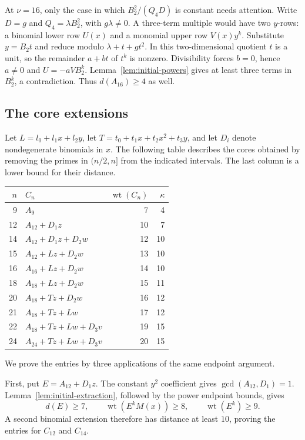 \documentclass[11pt]{article}
\DeclareMathOperator{\wt}{wt}\DeclareMathOperator{\ord}{ord}
\numberwithin{equation}{section}
\theoremstyle{definition}\newtheorem{definition}[theorem]{Definition}
\theoremstyle{remark}\newtheorem{remark}[theorem]{Remark}
\begin{document}
At $\nu=16$, only the case in which $B_2^2/(Q_4D)$ is constant
needs attention.
Write $D=g$ and $Q_4=\lambda B_2^2$, with $g\lambda\ne0$.
A three-term multiple would have two $y$-rows: a binomial lower row
$U(x)$ and a monomial upper row $V(x)y^k$. Substitute $y=B_2t$ and
reduce modulo $\lambda+t+gt^2$. In this two-dimensional quotient
$t$ is a unit, so the remainder $a+bt$ of $t^k$ is nonzero.
Divisibility forces $b=0$, hence $a\ne0$ and $U=-aVB_2^k$.
Lemma~\ref{lem:initial-powers} gives at least three terms in $B_2^k$,
a contradiction. Thus $d(A_{16})\ge4$ as well.

\subsection{The core extensions}

Let $L=l_0+l_1x+l_2y$, let
$T=t_0+t_1x+t_2x^2+t_3y$, and let $D_i$ denote nondegenerate
binomials in $x$. The following table describes the cores obtained by
removing the primes in $(n/2,n]$ from the indicated intervals.
The last column is a lower bound for their distance.
\begin{center}
\begin{tabular}{r|l|rr}
\toprule
$n$&$C_n$&$\wt(C_n)$&$\kappa$\\\midrule
9&$A_9$&7&4\\
12&$A_{12}+D_1z$&10&7\\
14&$A_{12}+D_1z+D_2w$&12&10\\
15&$A_{12}+Lz+D_2w$&13&10\\
16&$A_{16}+Lz+D_2w$&14&10\\
18&$A_{18}+Lz+D_2w$&15&11\\
20&$A_{18}+Tz+D_2w$&16&12\\
21&$A_{18}+Tz+Lw$&17&12\\
22&$A_{18}+Tz+Lw+D_3v$&19&15\\
24&$A_{24}+Tz+Lw+D_3v$&20&15\\
\bottomrule
\end{tabular}
\end{center}
We prove the entries by three applications of the same endpoint argument.

First, put $E=A_{12}+D_1z$. The constant $y^2$ coefficient gives
$\gcd(A_{12},D_1)=1$. Lemma~\ref{lem:initial-extraction}, followed by
the power endpoint bounds, gives
\begin{equation}\label{eq:initial-twelve-E}
 d(E)\ge7,\qquad \wt(E^kM(x))\ge8,\qquad \wt(E^k)\ge9.
\end{equation}
A second binomial extension therefore has distance at least $10$,
proving the entries for $C_{12}$ and $C_{14}$.
\end{document}
